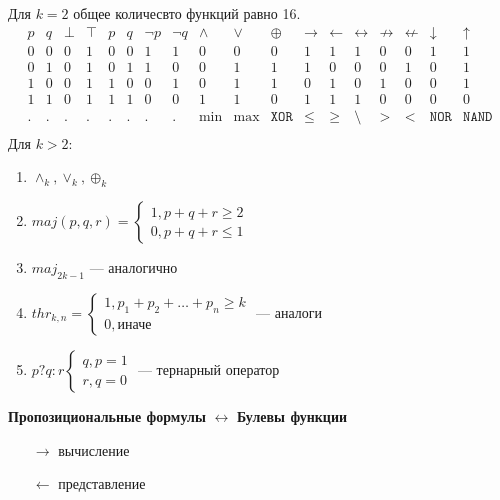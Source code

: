 Для $k = 2$ общее количесвто функций равно 16.
$$\begin{array}{cc|cccccccccccccccc}
    p & q & \perp & \top & p & q & \neg p & \neg q & \wedge & \vee & \oplus & \rightarrow & \leftarrow & \leftrightarrow & \not\rightarrow & \not\leftarrow & \downarrow & \uparrow\\
    \hline
    0 & 0 & 0 & 1 & 0 & 0 & 1 & 1 & 0 & 0 & 0 & 1 & 1 & 1 & 0 & 0 & 1 & 1\\
    0 & 1 & 0 & 1 & 0 & 1 & 1 & 0 & 0 & 1 & 1 & 1 & 0 & 0 & 0 & 1 & 0 & 1\\
    1 & 0 & 0 & 1 & 1 & 0 & 0 & 1 & 0 & 1 & 1 & 0 & 1 & 0 & 1 & 0 & 0 & 1\\
    1 & 1 & 0 & 1 & 1 & 1 & 0 & 0 & 1 & 1 & 0 & 1 & 1 & 1 & 0 & 0 & 0 & 0\\
    \hline
    . & . & . & . & . & . & . & . & \min & \max & \texttt{XOR} & \le & \ge & \setminus & > & < & \texttt{NOR} & \texttt{NAND}\\
\end{array}$$
Для $k > 2$:
\begin{enumerate}
    \item $\wedge_k, \vee_k, \oplus_k$
    \item $maj(p, q, r) = \left\{\begin{array}{l}
        1, p+q+r \ge 2  \\
        0, p+q+r \le 1 
    \end{array}\right.$
    \item $maj_{2k-1}$ --- аналогично
    \item $thr_{k, n} = \left\{\begin{array}{l}
        1, p_1 + p_2 + \dots + p_n \ge k  \\
        0,\text{иначе}
    \end{array}\right.$ --- аналоги
    \item $p?q:r\left\{\begin{array}{l}
        q, p = 1\\
        r, q = 0
    \end{array}\right.$ --- тернарный оператор
\end{enumerate}

\textbf{Пропозициональные формулы} $\longleftrightarrow$ \textbf{Булевы функции}
\begin{enumerate}
    \item[$\rightarrow$] вычисление
    \item[$\leftarrow$] представление
\end{enumerate}

